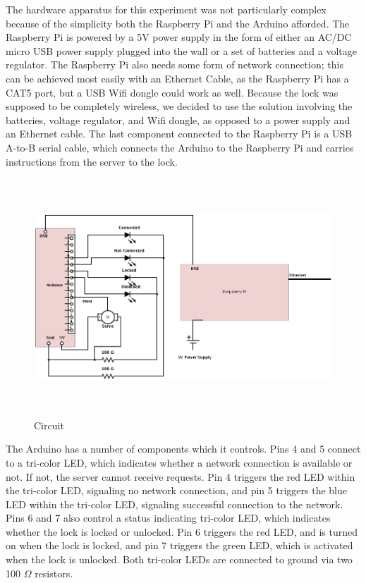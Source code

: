 \documentclass[10pt]{article}
\begin{document}
\begin{multicols}{2}
The hardware apparatus for this experiment was not particularly complex because of the simplicity both the Raspberry Pi and the Arduino afforded. The Raspberry Pi is powered by a 5V power supply in the form of either an AC/DC micro USB power supply plugged into the wall or a set of batteries and a voltage regulator. The Raspberry Pi also needs some form of network connection; this can be achieved most easily with an Ethernet Cable, as the Raspberry Pi has a CAT5 port, but a USB Wifi dongle could work as well. Because the lock was supposed to be completely wireless, we decided to use the solution involving the batteries, voltage regulator, and Wifi dongle, as opposed to a power supply and an Ethernet cable. The last component connected to the Raspberry Pi is a USB A-to-B serial cable, which connects the Arduino to the Raspberry Pi and carries instructions from the server to the lock. \\

\begin{figure}[t!]
\centering
\includegraphics[height=3.5in]{circuit.png}
\caption{Circuit}
\end{figure}

The Arduino has a number of components which it controls. Pins 4 and 5 connect to a tri-color LED, which indicates whether a network connection is available or not. If not, the server cannot receive requests. Pin 4 triggers the red LED within the tri-color LED, signaling no network connection, and pin 5 triggers the blue LED within the tri-color LED, signaling successful connection to the network. Pins 6 and 7 also control a status indicating tri-color LED, which indicates whether the lock is locked or unlocked. Pin 6 triggers the red LED, and is turned on when the lock is locked, and pin 7 triggers the green LED, which is activated when the lock is unlocked. Both tri-color LEDs are connected to ground via two 100 $\Omega$ resistors. \\


\end{multicols}
\end{document}
